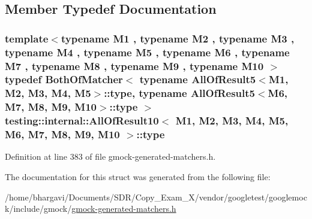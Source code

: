 \subsection{Member Typedef Documentation}
\subsubsection[{\texorpdfstring{type}{type}}]{\setlength{\rightskip}{0pt plus 5cm}template$<$typename M1 , typename M2 , typename M3 , typename M4 , typename M5 , typename M6 , typename M7 , typename M8 , typename M9 , typename M10 $>$ typedef {\bf Both\+Of\+Matcher}$<$ typename {\bf All\+Of\+Result5}$<$M1, M2, M3, M4, M5$>$\+::{\bf type}, typename {\bf All\+Of\+Result5}$<$M6, M7, M8, M9, M10$>$\+::{\bf type} $>$ {\bf testing\+::internal\+::\+All\+Of\+Result10}$<$ M1, M2, M3, M4, M5, M6, M7, M8, M9, M10 $>$\+::{\bf type}}\hypertarget{structtesting_1_1internal_1_1_all_of_result10_a48d6c6de6d0d5445b212119e1f536af5}{}\label{structtesting_1_1internal_1_1_all_of_result10_a48d6c6de6d0d5445b212119e1f536af5}


Definition at line 383 of file gmock-\/generated-\/matchers.\+h.



The documentation for this struct was generated from the following file\+:\begin{DoxyCompactItemize}
\item 
/home/bhargavi/\+Documents/\+S\+D\+R/\+Copy\+\_\+\+Exam\+\_\+X/vendor/googletest/googlemock/include/gmock/\hyperlink{gmock-generated-matchers_8h}{gmock-\/generated-\/matchers.\+h}\end{DoxyCompactItemize}
